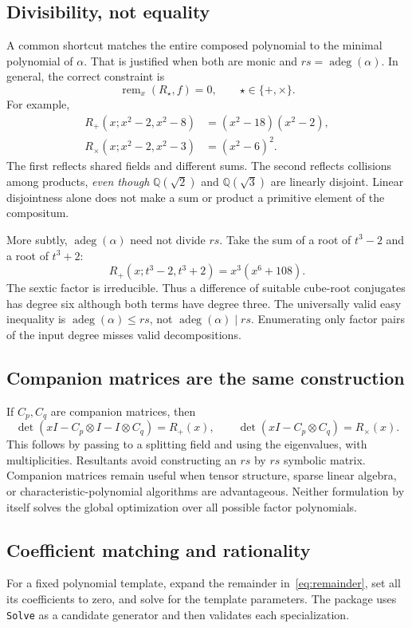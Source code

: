 \documentclass[11pt,letterpaper]{article}
\theoremstyle{definition}\newtheorem{definition}[theorem]{Definition}
\theoremstyle{remark}\newtheorem{remark}[theorem]{Remark}
\newcommand{\Q}{\mathbb Q}
\newcommand{\ad}{\operatorname{adeg}}
\newcommand{\WL}[1]{\texttt{#1}}
\begin{document}
\subsection{Divisibility, not equality}
A common shortcut matches the entire composed polynomial to the minimal polynomial of $\alpha$. That is justified when both are monic and $rs=\ad(\alpha)$. In general, the correct constraint is
\begin{equation}
 \operatorname{rem}_x(R_\star,f)=0,
 \qquad \star\in\{+,\times\}.
 \label{eq:remainder}
\end{equation}
For example,
\begin{align*}
 R_+(x;x^2-2,x^2-8)&=(x^2-18)(x^2-2),\\
 R_\times(x;x^2-2,x^2-3)&=(x^2-6)^2.
\end{align*}
The first reflects shared fields and different sums. The second reflects collisions among products, \emph{even though} $\Q(\sqrt2)$ and $\Q(\sqrt3)$ are linearly disjoint. Linear disjointness alone does not make a sum or product a primitive element of the compositum.

More subtly, $\ad(\alpha)$ need not divide $rs$. Take the sum of a root of $t^3-2$ and a root of $t^3+2$:
\begin{equation}
 R_+(x;t^3-2,t^3+2)=x^3(x^6+108).
 \label{eq:6not9}
\end{equation}
The sextic factor is irreducible. Thus a difference of suitable cube-root conjugates has degree six although both terms have degree three. The universally valid easy inequality is $\ad(\alpha)\le rs$, not $\ad(\alpha)\mid rs$. Enumerating only factor pairs of the input degree misses valid decompositions.

\subsection{Companion matrices are the same construction}
If $C_p,C_q$ are companion matrices, then
\[
 \det(xI-C_p\otimes I-I\otimes C_q)=R_+(x),\qquad
 \det(xI-C_p\otimes C_q)=R_\times(x).
\]
This follows by passing to a splitting field and using the eigenvalues, with multiplicities. Resultants avoid constructing an $rs$ by $rs$ symbolic matrix. Companion matrices remain useful when tensor structure, sparse linear algebra, or characteristic-polynomial algorithms are advantageous. Neither formulation by itself solves the global optimization over all possible factor polynomials.

\subsection{Coefficient matching and rationality}
For a fixed polynomial template, expand the remainder in~\eqref{eq:remainder}, set all its coefficients to zero, and solve for the template parameters. The package uses \WL{Solve} as a candidate generator and then validates each specialization.
\end{document}

